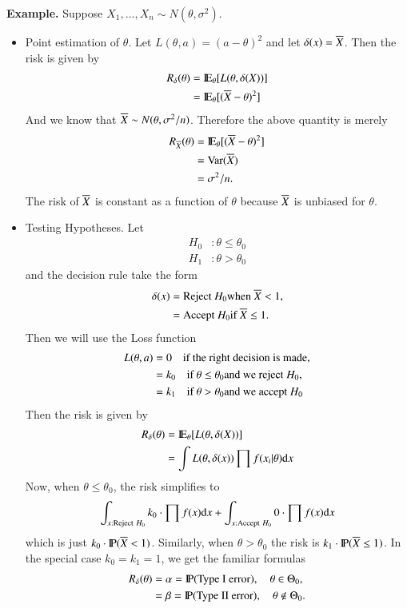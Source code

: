 \documentclass[captions=tableheading]{scrbook}
\begin{document}
\textbf{Example.} Suppose $X_{1},\ldots,X_{n}\sim N(\theta,\sigma^{2})$.

\begin{itemize}
\item Point estimation of $\theta$. Let $L(\theta,a)=(a-\theta)^{2}$ and let $\delta(x)=\Xbar$. Then the risk is given by 
   \begin{align*}
   R_{\delta}(\theta) & =\E_{\theta}[L(\theta,\delta(X))]\\
   & =\E_{\theta}[(\Xbar-\theta)^{2}]
   \end{align*}
   And we know that $\Xbar\sim N(\theta,\sigma^{2}/n)$. Therefore the above quantity is merely 
   \begin{align*}
   R_{\Xbar}(\theta) & =\E_{\theta}[(\Xbar-\theta)^{2}]\\
   & =\mathrm{Var}(\Xbar)\\
   & =\sigma^{2}/n.
   \end{align*}
   The risk of $\Xbar$ is constant as a function of $\theta$ because $\Xbar$ is unbiased for $\theta$.
\item Testing Hypotheses. Let 
   \begin{align*}
   H_{0} & :\theta \leq \theta_{0}\\
   H_{1} & :\theta > \theta_{0}
   \end{align*}
   and the decision rule take the form 
   \begin{align*}
   \delta(x) & =\mbox{Reject \ensuremath{H_{0}}when \ensuremath{\Xbar<1},}\\
 & =\mbox{Accept \ensuremath{H_{0}}if \ensuremath{\Xbar\leq1}.}
   \end{align*}
   Then we will use the Loss function 
   \begin{align*}
   L(\theta,a) & =0\quad\mbox{if the right decision is made,}\\
 & =k_{0}\quad\mbox{if \ensuremath{\theta\leq\theta_{0}}and we reject \ensuremath{H_{0}},}\\
 & =k_{1}\quad\mbox{if \ensuremath{\theta>\theta_{0}}and we accept \ensuremath{H_{0}}}
   \end{align*}
   Then the risk is given by 
   \begin{align*}
   R_{\delta}(\theta) & =\E_{\theta}[L(\theta,\delta(X))]\\
   & =\int L(\theta,\delta(x))\prod f(x_{i}|\theta)\diff x
   \end{align*}
   Now, when $\theta \leq \theta_{0}$, the risk simplifies to 
   \[
   \int_{x:\mathrm{Reject}\ H_{0}}k_{0}\cdot\prod f(x)\diff x+\int_{x:\mathrm{Accept}\ H_{0}}0\cdot\prod f(x)\diff x
   \]
   which is just $k_{0}\cdot\P(\Xbar<1)$. Similarly, when $\theta>\theta_{0}$ the risk is \newline $k_{1}\cdot\P(\Xbar\leq1)$. In the special case $k_{0}=k_{1}=1$, we get the familiar formulas 
   \begin{align*}
   R_{\delta}(\theta) & =\alpha=\P(\mbox{Type I error}),\quad\theta\in\Theta_{0},\\
 & =\beta=\P(\mbox{Type II error}),\quad\theta\notin\Theta_{0}.
   \end{align*}
\end{itemize}
\end{document}
